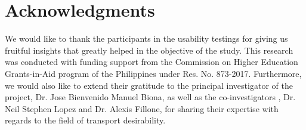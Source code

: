 \documentclass{sigchi}
\begin{document}





\section{Acknowledgments}

We would like to thank the participants in the usability testings for giving us fruitful insights that greatly helped in the objective of the study. This research was conducted with funding support from the Commission on Higher Education Grants-in-Aid program of the Philippines under Res. No. 873-2017. Furthermore, we would also like to extend their gratitude to the principal investigator of the project, Dr. Jose Bienvenido Manuel Biona, as well as the co-investigators , Dr. Neil Stephen Lopez and Dr. Alexis Fillone, for sharing their expertise with regards to the field of transport desirability.
\end{document}
